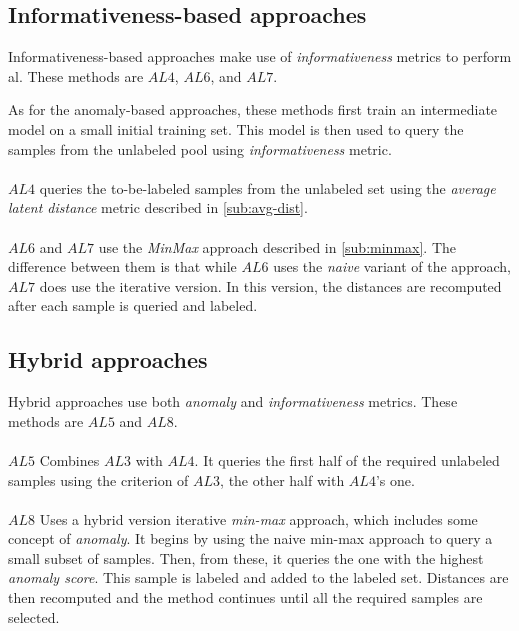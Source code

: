     \subsection{Informativeness-based approaches}
    
    Informativeness-based approaches make use of \emph{informativeness} metrics to perform \acrshort{al}. These methods are $AL4$,  $AL6$, and $AL7$.
    
    As for the anomaly-based approaches, these methods first train an intermediate model on a small initial training set. This model is then used to query the samples from the unlabeled pool using \emph{informativeness} metric.
    \\
    \\
    $AL4$ queries the to-be-labeled samples from the unlabeled set using the \emph{average latent distance} metric described in \autoref{sub:avg-dist}.
    \\
    \\
    $AL6$ and $AL7$ use the \emph{MinMax} approach described in \autoref{sub:minmax}. The difference between them is that while $AL6$ uses the \emph{naive} variant of the approach, $AL7$ does use the iterative version. In this version, the distances are recomputed after each sample is queried and labeled.
    
    
    
    \subsection{Hybrid approaches}
    Hybrid approaches use both \emph{anomaly} and \emph{informativeness} metrics. These methods are $AL5$ and $AL8$.
    \\
    \\
    $AL5$ Combines $AL3$ with $AL4$. It queries the first half of the required unlabeled samples using the criterion of $AL3$, the other half with $AL4$'s one.
    \\
    \\
    $AL8$ Uses a hybrid version iterative \emph{min-max} approach, which includes some concept of \emph{anomaly}. It begins by using the naive min-max approach to query a small subset of samples. Then, from these, it queries the one with the highest \emph{anomaly score}. This sample is labeled and added to the labeled set. Distances are then recomputed and the method continues until all the required samples are selected.
    
    